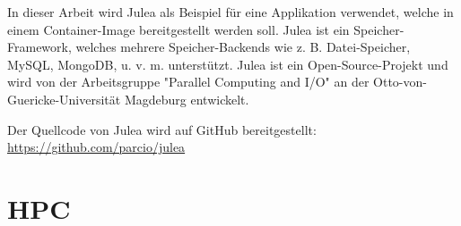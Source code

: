 In dieser Arbeit wird Julea als Beispiel für eine Applikation verwendet, welche in einem Container-Image bereitgestellt werden soll. Julea ist ein Speicher-Framework, welches mehrere Speicher-Backends wie z. B. Datei-Speicher, MySQL, MongoDB, u. v. m. unterstützt. Julea ist ein Open-Source-Projekt und wird von der Arbeitsgruppe "Parallel Computing and I/O" an der Otto-von-Guericke-Universität Magdeburg entwickelt.

Der Quellcode von Julea wird auf GitHub bereitgestellt: \url{https://github.com/parcio/julea}

\section{HPC}

